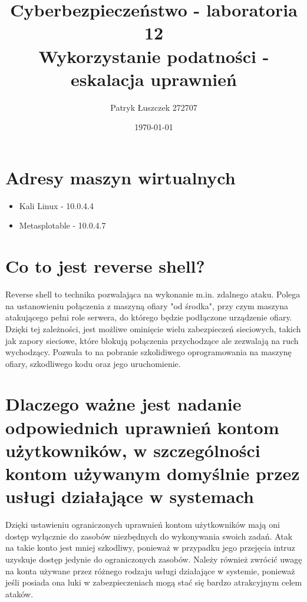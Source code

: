 \documentclass{article}
\title{%
  Cyberbezpieczeństwo - laboratoria 12 \\
  \large Wykorzystanie podatności - eskalacja uprawnień}
\author{Patryk Łuszczek 272707}
\date{\today}
\begin{document}
\maketitle
\newpage
\section*{Adresy maszyn wirtualnych}
\begin{itemize}
    \item Kali Linux - 10.0.4.4
    \item Metasplotable - 10.0.4.7
\end{itemize}
\section*{Co to jest reverse shell?}
Reverse shell to technika pozwalająca na wykonanie m.in. zdalnego ataku. Polega na ustanowieniu połączenia z maszyną ofiary
"od środka", przy czym maszyna atakującego pełni role serwera, do którego będzie podłączone urządzenie ofiary. Dzięki tej zależności, jest możliwe ominięcie wielu zabezpieczeń sieciowych, takich jak zapory sieciowe, które blokują połączenia przychodzące
ale zezwalają na ruch wychodzący. Pozwala to na pobranie szkolidiwego oprogramowania na maszynę ofiary, szkodliwego kodu oraz jego uruchomienie.
\section*{Dlaczego ważne jest nadanie odpowiednich uprawnień kontom użytkowników, w
  szczególności kontom używanym domyślnie przez usługi działające w systemach}

Dzięki ustawieniu ograniczonych uprawnień kontom użytkowników mają oni dostęp wyłącznie do zasobów niezbędnych do wykonywania swoich zadań.
Atak na takie konto jest mniej szkodliwy, ponieważ w przypadku jego przejęcia intruz uzyskuje dostęp jedynie do ograniczonych zasobów. Należy również zwrócić uwagę na konta używane przez różnego rodzaju usługi działające w systemie,
ponieważ jeśli posiada ona luki w zabezpieczeniach mogą stać się bardzo atrakcyjnym celem ataków.
\end{document}

